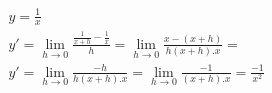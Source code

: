 \begin{ex}
\begin{align}
&y=\frac{1}{x}\nonumber\\
&y'=\lim_{h\rightarrow 0} \frac{\frac{1}{x+h}-\frac{1}{x}}{h}=\lim_{h\rightarrow 0} \frac{x-(x+h)}{h(x+h).x}=\nonumber\\
&y'=\lim_{h\rightarrow 0} \frac{-h}{h(x+h).x}=\lim_{h\rightarrow 0} \frac{-1}{(x+h).x}=\frac{-1}{x^2}\nonumber
\end{align}
\end{ex}